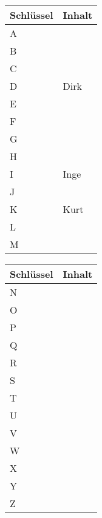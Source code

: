 \documentclass{bschlangaul-aufgabe}
\begin{document}
\begin{multicols}{2}
\noindent
\begin{tabularx}{\linewidth}{|l||X|}
\hline
Schlüssel & Inhalt \\\hline\hline
A &\\\hline
B &\\\hline
C &\\\hline
D & Dirk \\\hline
E &\\\hline
F &\\\hline
G &\\\hline
H &\\\hline
I & Inge \\\hline
J &\\\hline
K & Kurt \\\hline
L &\\\hline
M &\\\hline
\end{tabularx}

\noindent
\begin{tabularx}{\linewidth}{|l||X|}
\hline
Schlüssel & Inhalt \\\hline\hline
N & \\\hline
O & \\\hline
P & \\\hline
Q & \\\hline
R & \\\hline
S & \\\hline
T & \\\hline
U & \\\hline
V & \\\hline
W & \\\hline
X & \\\hline
Y & \\\hline
Z & \\\hline
\end{tabularx}
\end{multicols}
\end{document}
